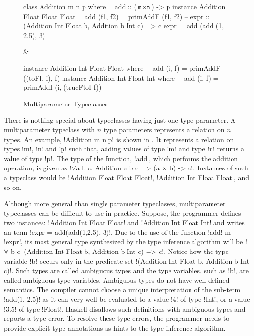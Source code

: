 \documentclass[format=acmsmall,manuscript,screen,nonacm,margin=1in,11pt]{acmart}
\begin{document}
\begin{figure}[ht]
  \begin{tabularx}\textwidth{X X}
\begin{code}^^J
class Addition m n p where^^J
\ \ add :: ($\texttt{m} \times \texttt{n}$) -> p^^J
^^J
instance Addition Float Float Float^^J
\ \ add (f1, f2) = primAddF (f1, f2)^^J
^^J
-- expr :: (Addition Int Float b, Addition b Int c) => c^^J
expr = add (add (1, 2.5), 3)^^J
\end{code}&%
\begin{code}^^J
instance Addition Int Float Float where^^J
\ \ add (i, f) = primAddF ((toFlt i), f)^^J
^^J
instance Addition Int Float Int where^^J
\ \ add (i, f) = primAddI (i, (trucFtoI f))^^J
\end{code}
  \end{tabularx}
  \caption{Multiparameter Typeclasses}
  \label{fig:multip-typeclass}
\end{figure}

There is nothing special about typeclasses having just one type parameter. 
A multiparameter typeclass with $n$ type parameters represents a relation on $n$ types.
An example, !Addition m n p! is shown in .
It represents a relation on types !m!, !n! and !p! such that, adding values of type !m! and type !n!
returns a value of type !p!. The type of the function, !add!, which performs the addition operation,
is given as !$\forall$a b c. Addition a b c => (a $\times$ b) -> c!. Instances of such a typeclass would be
!Addition Float Float Float!, !Addition Int Float Float!, and so on.

Although more general than single parameter typeclasses, multiparameter typeclasses can be
difficult to use in practice. Suppose, the programmer defines two instances:
!Addition Int Float Float! and !Addition Int Float Int!
and writes an term !expr = add(add(1,2.5), 3)!.
Due to the use of the function !add! in !expr!, its most general type synthesized
by the type inference algorithm will be !$\forall$ b c. (Addition Int Float b, Addition b Int c) => c!.
Notice how the type variable !b! occurs only in the predicate set !(Addition Int Float b, Addition b Int c)!.
Such types are called ambiguous types and the type variables, such as !b!,
are called ambiguous type variables. Ambiguous types do not have well defined semantics.
The compiler cannot choose a unique interpretation of the sub-term !add(1, 2.5)! as it can very well be
evaluated to a value !4! of type !Int!, or a value !3.5! of type !Float!.
Haskell disallows such definitions with ambiguous types and reports a type error.
To resolve these type errors, the programmer needs to provide explicit type annotations
as hints to the type inference algorithm.
\end{document}
